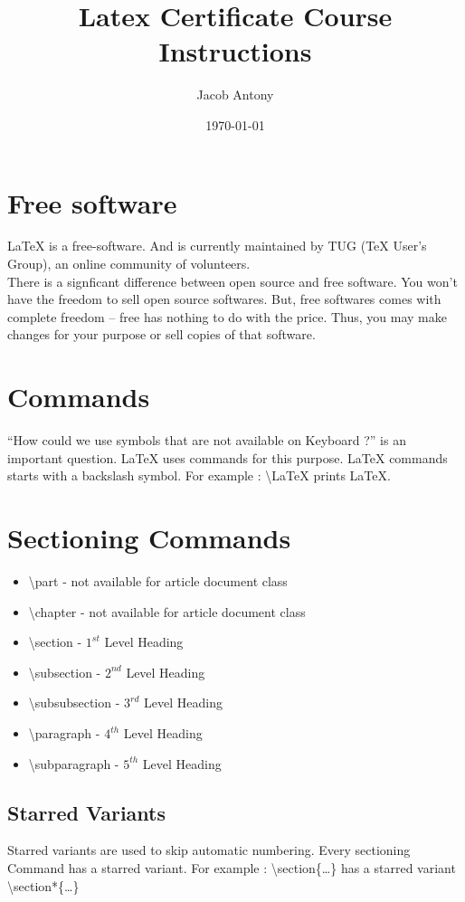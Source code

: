 \documentclass{article}
\title{Latex Certificate Course Instructions}
\author{Jacob Antony}
\date{\today}
\begin{document}
\maketitle
\section{Free software}
LaTeX is a free-software. And is currently maintained by TUG (TeX User's Group), an online community of volunteers.\\

There is a signficant difference between open source and free software. You won't have the freedom to sell open source softwares. But, free softwares comes with complete freedom -- free has nothing to do with the price. Thus, you may make changes for your purpose or sell copies of that software.

\section{Commands}
``How could we use symbols that are not available on Keyboard ?'' is an important question. LaTeX uses commands for this purpose. LaTeX commands starts with a backslash symbol. For example : \textbackslash LaTeX prints \LaTeX{}.

\section{Sectioning Commands}
\begin{itemize}
	\item \textbackslash{}part - not available for article document class
	\item \textbackslash{}chapter - not available for article document class
	\item \textbackslash{}section - $1^{st}$ Level Heading
	\item \textbackslash{}subsection - $2^{nd}$ Level Heading
	\item \textbackslash{}subsubsection - $3^{rd}$ Level Heading
	\item \textbackslash{}paragraph - $4^{th}$ Level Heading
	\item \textbackslash{}subparagraph -  $5^{th}$ Level Heading
\end{itemize}

\subsection*{Starred Variants}
Starred variants  are used to skip automatic numbering. Every sectioning Command has a starred variant. For example : \textbackslash{}section\{\dots\} has a starred variant \textbackslash{}section*\{\dots\}
\end{document}
